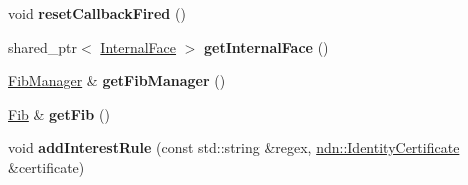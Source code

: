 \begin{DoxyCompactItemize}
\item 
void {\bfseries reset\+Callback\+Fired} ()\hypertarget{classnfd_1_1tests_1_1FibManagerFixture_a7230b47dc3a82f1b803689d43d3441eb}{}\label{classnfd_1_1tests_1_1FibManagerFixture_a7230b47dc3a82f1b803689d43d3441eb}

\item 
shared\+\_\+ptr$<$ \hyperlink{classnfd_1_1InternalFace}{Internal\+Face} $>$ {\bfseries get\+Internal\+Face} ()\hypertarget{classnfd_1_1tests_1_1FibManagerFixture_a6ec332e899bf5ed7714153310a4a08b5}{}\label{classnfd_1_1tests_1_1FibManagerFixture_a6ec332e899bf5ed7714153310a4a08b5}

\item 
\hyperlink{classnfd_1_1FibManager}{Fib\+Manager} \& {\bfseries get\+Fib\+Manager} ()\hypertarget{classnfd_1_1tests_1_1FibManagerFixture_aa17b6dff196340ddd4a2a589174189db}{}\label{classnfd_1_1tests_1_1FibManagerFixture_aa17b6dff196340ddd4a2a589174189db}

\item 
\hyperlink{classnfd_1_1Fib}{Fib} \& {\bfseries get\+Fib} ()\hypertarget{classnfd_1_1tests_1_1FibManagerFixture_a1fe68037847c0f05e63bc602285e6a75}{}\label{classnfd_1_1tests_1_1FibManagerFixture_a1fe68037847c0f05e63bc602285e6a75}

\item 
void {\bfseries add\+Interest\+Rule} (const std\+::string \&regex, \hyperlink{classndn_1_1IdentityCertificate}{ndn\+::\+Identity\+Certificate} \&certificate)\hypertarget{classnfd_1_1tests_1_1FibManagerFixture_aa9dc132fd4bf283856ad83abe9856f84}{}\label{classnfd_1_1tests_1_1FibManagerFixture_aa9dc132fd4bf283856ad83abe9856f84}

\end{DoxyCompactItemize}
